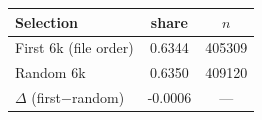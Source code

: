 \begin{tabular}{lcc}
\toprule
Selection & share & $n$ \\
\midrule
First 6k (file order) & 0.6344 & 405309 \\
Random 6k & 0.6350 & 409120 \\
$\Delta$ (first$-$random) & -0.0006 & — \\
\bottomrule
\end{tabular}
